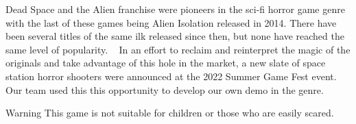 Dead Space and the Alien franchise were pioneers in the sci-\/fi horror game genre with the last of these games being Alien Isolation released in 2014. There have been several titles of the same ilk released since then, but none have reached the same level of popularity. ~\newline
 In an effort to reclaim and reinterpret the magic of the originals and take advantage of this hole in the market, a new slate of space station horror shooters were announced at the 2022 Summer Game Fest event. Our team used this this opportunity to develop our own demo in the genre.

\begin{DoxyWarning}{Warning}
This game is not suitable for children or those who are easily scared. 
\end{DoxyWarning}
